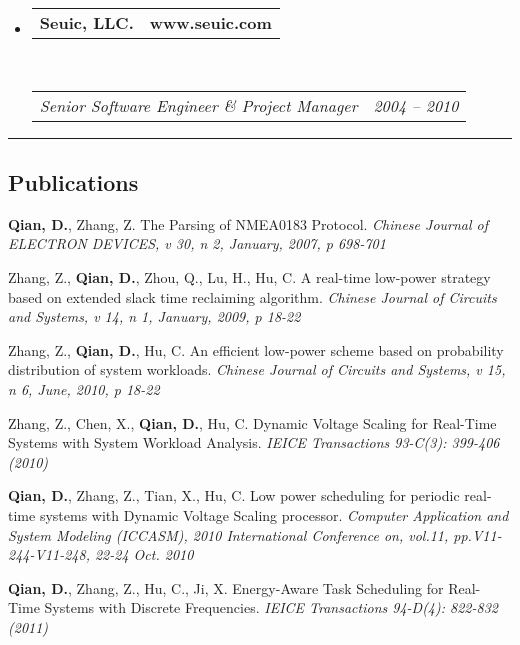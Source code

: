 \documentclass[10pt,letterpaper]{article}
\makeatletter
\newcommand{\headerrow}[2]
{\begin{tabular*}{\linewidth}{l@{\extracolsep{\fill}}r}
	#1 &
	#2 \\
\end{tabular*}}
\makeatother
\begin{document}
\begin{itemize}
	\item
	\headerrow
		{\textbf{Seuic, LLC.}}
		{\textbf{www.seuic.com}}
	\\
	\headerrow
		{\emph{Senior Software Engineer \& Project Manager}}
		{\emph{2004 -- 2010}}

\end{itemize}


\hrule
\vspace{-0.4em}
\subsection*{Publications}

\begin{itemize*}
	\item
        \textbf{Qian, D.}, Zhang, Z. The Parsing of NMEA0183 Protocol. \emph{Chinese Journal of ELECTRON DEVICES, v 30, n 2, January, 2007, p 698-701}
        \item
        Zhang, Z., \textbf{Qian, D.}, Zhou, Q., Lu, H., Hu, C. A real-time low-power strategy based on extended slack time reclaiming algorithm. \emph{Chinese Journal of Circuits and Systems, v 14, n 1, January, 2009, p 18-22}
        \item
        Zhang, Z., \textbf{Qian, D.}, Hu, C. An efficient low-power scheme based on probability distribution of system workloads. \emph{Chinese Journal of Circuits and Systems, v 15, n 6, June, 2010, p 18-22}
        \item
        Zhang, Z., Chen, X., \textbf{Qian, D.}, Hu, C. Dynamic Voltage Scaling for Real-Time Systems with System Workload Analysis. \emph{IEICE Transactions 93-C(3): 399-406 (2010)}
	\item
        \textbf{Qian, D.}, Zhang, Z., Tian, X., Hu, C. Low power scheduling for periodic real-time systems with Dynamic Voltage Scaling processor. \emph{Computer Application and System Modeling (ICCASM), 2010 International Conference on, vol.11, pp.V11-244-V11-248, 22-24 Oct. 2010}
	\item
	\textbf{Qian, D.}, Zhang, Z., Hu, C., Ji, X. Energy-Aware Task Scheduling for Real-Time Systems with Discrete Frequencies. \emph{IEICE Transactions 94-D(4): 822-832 (2011)}
\end{itemize*}
\end{document}
